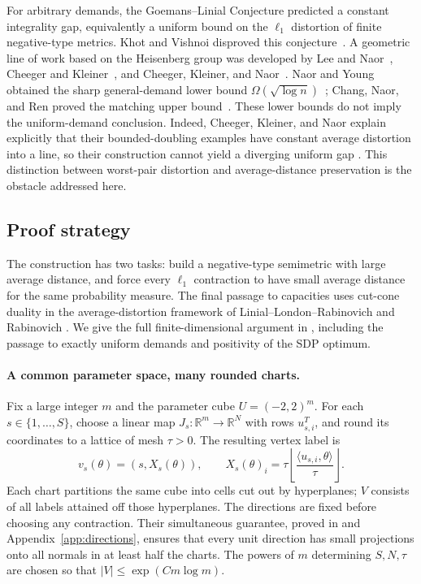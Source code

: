 \documentclass[11pt]{article}
\numberwithin{equation}{section}
\theoremstyle{definition}
\theoremstyle{remark}
\newcommand{\R}{\mathbb R}
\begin{document}
For arbitrary demands, the Goemans--Linial Conjecture predicted a constant
integrality gap, equivalently a uniform bound on the $\ell_1$ distortion
of finite negative-type metrics. Khot and Vishnoi disproved this
conjecture~\cite{KV15}. A geometric line of work based on the Heisenberg
group was developed by Lee and Naor~\cite{LN06}, Cheeger and
Kleiner~\cite{CK10}, and Cheeger, Kleiner, and Naor~\cite{CKN09,CKN11}. Naor and Young obtained the sharp general-demand
lower bound $\Omega(\sqrt{\log n})$~\cite{NY18}; Chang, Naor, and Ren
proved the matching upper bound~\cite{CNR25STOC,CNR25}.
These lower bounds do not imply the uniform-demand conclusion.
Indeed, Cheeger, Kleiner, and Naor explain explicitly that their
bounded-doubling examples have constant average distortion into a line,
so their construction cannot yield a diverging uniform gap
\cite[Remark~1.1]{CKN09}. This distinction between worst-pair distortion
and average-distance preservation is the obstacle addressed here.

\subsection{Proof strategy}

The construction has two tasks: build a negative-type semimetric with
large average distance, and force every $\ell_1$ contraction to have
small average distance for the same probability measure. The final
passage to capacities uses cut-cone duality in the average-distortion
framework of Linial--London--Rabinovich and Rabinovich
\cite{LLR95,Rab03,Rab08}.
We give the full finite-dimensional argument in ,
including the passage to exactly uniform demands and positivity of the
SDP optimum.

\paragraph{A common parameter space, many rounded charts.}
Fix a large integer $m$ and the parameter cube $U=(-2,2)^m$.
For each $s\in\{1,\ldots,S\}$, choose a linear map
$J_s:\R^m\to\R^N$ with rows $u_{s,i}^{T}$, and round its coordinates
to a lattice of mesh $\tau>0$. The resulting vertex label is
\[
 v_s(\theta)=(s,X_s(\theta)),\qquad
 X_s(\theta)_i=\tau\left\lfloor
 \frac{\langle u_{s,i},\theta\rangle}{\tau}\right\rfloor.
\]
Each chart partitions the same cube into cells cut out by hyperplanes;
$V$ consists of all labels attained off those hyperplanes.
The directions are fixed before choosing any contraction. Their
simultaneous guarantee, proved in  and
Appendix~\ref{app:directions}, ensures that every unit direction has
small projections onto all normals in at least half the charts.
The powers of $m$ determining $S,N,\tau$ are chosen so that
$|V|\le\exp(Cm\log m)$.
\end{document}
